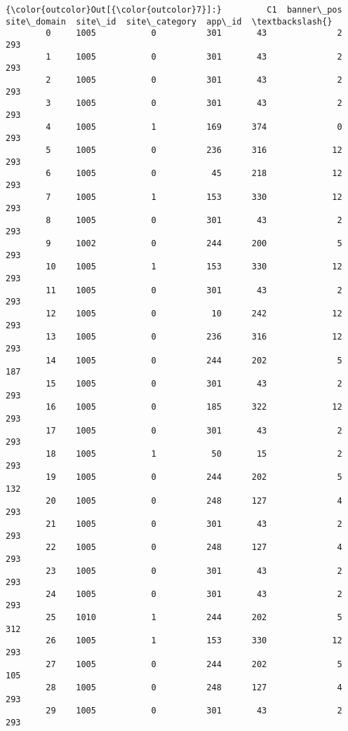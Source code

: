 \documentclass[11pt]{article}
\begin{document}
\begin{Verbatim}[commandchars=\\\{\}]
{\color{outcolor}Out[{\color{outcolor}7}]:}         C1  banner\_pos  site\_domain  site\_id  site\_category  app\_id  \textbackslash{}
        0     1005           0          301       43              2     293   
        1     1005           0          301       43              2     293   
        2     1005           0          301       43              2     293   
        3     1005           0          301       43              2     293   
        4     1005           1          169      374              0     293   
        5     1005           0          236      316             12     293   
        6     1005           0           45      218             12     293   
        7     1005           1          153      330             12     293   
        8     1005           0          301       43              2     293   
        9     1002           0          244      200              5     293   
        10    1005           1          153      330             12     293   
        11    1005           0          301       43              2     293   
        12    1005           0           10      242             12     293   
        13    1005           0          236      316             12     293   
        14    1005           0          244      202              5     187   
        15    1005           0          301       43              2     293   
        16    1005           0          185      322             12     293   
        17    1005           0          301       43              2     293   
        18    1005           1           50       15              2     293   
        19    1005           0          244      202              5     132   
        20    1005           0          248      127              4     293   
        21    1005           0          301       43              2     293   
        22    1005           0          248      127              4     293   
        23    1005           0          301       43              2     293   
        24    1005           0          301       43              2     293   
        25    1010           1          244      202              5     312   
        26    1005           1          153      330             12     293   
        27    1005           0          244      202              5     105   
        28    1005           0          248      127              4     293   
        29    1005           0          301       43              2     293   

\end{Verbatim}
\end{document}
